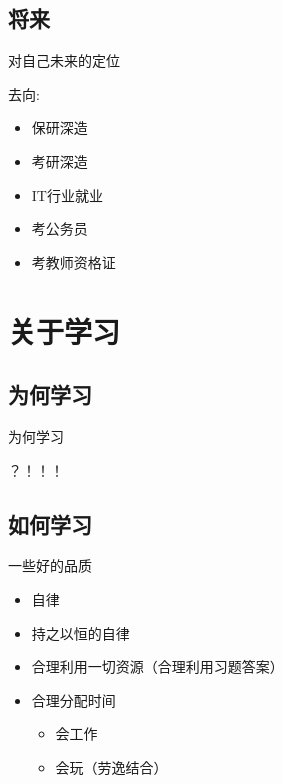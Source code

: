 \documentclass[UTF8]{ctexbeamer}
\begin{document}
\subsection[将来]{将来}
\begin{frame}{对自己未来的定位}

  去向: 
  \begin{itemize}
  \item
    保研深造\pause
  \item
    考研深造\pause
  \item
    IT行业就业\pause
  \item
	考公务员\pause
  \item
	考教师资格证
  \end{itemize}
\end{frame}








\section[关于学习]{关于学习}


\subsection[为何学习]{为何学习}
\begin{frame}{为何学习}\pause
\centerline{？！！！}
\end{frame}











\subsection[如何学习]{如何学习}

\begin{frame}{一些好的品质}
\begin{itemize}
  \item
    自律\pause
  \item
    持之以恒的自律\pause
  \item
    合理利用一切资源（合理利用习题答案）\pause
  \item
	 合理分配时间\pause
     \begin{itemize}  
     \item
     会工作\pause
     \item
     会玩（劳逸结合）
     \end{itemize}
  \end{itemize}



\end{frame}
\end{document}
